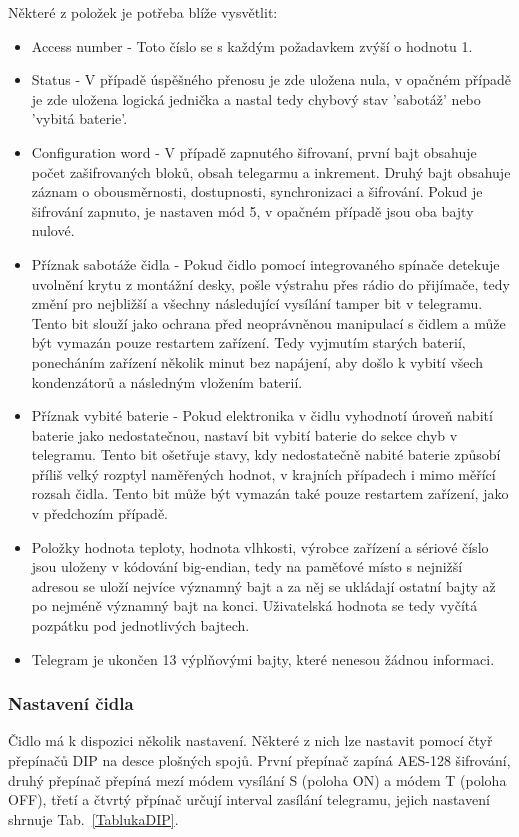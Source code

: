 \newpage{}

Některé z položek je potřeba blíže vysvětlit:

\begin{itemize}
	\item Access number - Toto číslo se s každým požadavkem zvýší o hodnotu 1.
	\item Status - V případě úspěšného přenosu je zde uložena nula, v opačném případě je zde uložena logická jednička a nastal tedy chybový stav 'sabotáž' nebo 'vybitá baterie'.
	\item Configuration word - V případě zapnutého šifrovaní, první bajt obsahuje počet zašifrovaných bloků, obsah telegarmu a inkrement. Druhý bajt obsahuje záznam o obousměrnosti, dostupnosti, synchronizaci a šifrování. Pokud je šifrování zapnuto, je nastaven mód 5, v opačném případě jsou oba bajty nulové.
	\item Příznak sabotáže čidla - Pokud čidlo pomocí integrovaného spínače detekuje uvolnění krytu z montážní desky, pošle výstrahu přes rádio do přijímače, tedy změní pro nejbližší a všechny následující vysílání tamper bit v telegramu. Tento bit slouží jako ochrana před neoprávněnou manipulací s čidlem a může být vymazán pouze restartem zařízení. Tedy vyjmutím starých baterií, ponecháním zařízení několik minut bez napájení, aby došlo k vybití všech kondenzátorů a následným vložením baterií.
\item Příznak vybité baterie - Pokud elektronika v čidlu vyhodnotí úroveň nabití baterie jako nedostatečnou, nastaví bit vybití baterie do sekce chyb v telegramu. Tento bit ošetřuje stavy, kdy nedostatečně nabité baterie způsobí příliš velký rozptyl naměřených hodnot, v krajních případech i mimo měřící rozsah čidla. Tento bit může být vymazán také pouze restartem zařízení, jako v předchozím případě.
\item Položky hodnota teploty, hodnota vlhkosti, výrobce zařízení a sériové číslo jsou uloženy v kódování big-endian, tedy na paměťové místo s nejnižší adresou se uloží nejvíce významný bajt a za něj se ukládají ostatní bajty až po nejméně významný bajt na konci. Uživatelská hodnota se tedy vyčítá pozpátku pod jednotlivých bajtech.
\item Telegram je ukončen 13 výplňovými bajty, které nenesou žádnou informaci.
\end{itemize}


\subsubsection{Nastavení čidla}
Čidlo má k dispozici několik nastavení. Některé z nich lze nastavit pomocí čtyř přepínačů DIP na desce plošných spojů.
První přepínač zapíná AES-128 šifrování, druhý přepínač přepíná mezí módem vysílání S (poloha ON) a módem T (poloha OFF), třetí a čtvrtý přpínač určují interval zasílání telegramu, jejich nastavení shrnuje Tab.~\ref{TablukaDIP}.

